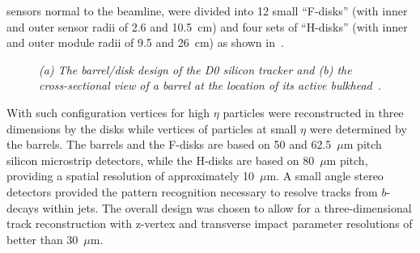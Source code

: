 sensors normal to the beamline, were divided into 12 small ``F-disks'' (with
inner and outer sensor radii of 2.6 and 10.5~cm) and four sets of ``H-disks''
(with inner and outer module radii of 9.5 and 26~cm) as shown in~.
\begin{figure}[!htbp]
  \centering {} 
  \caption{\textit{(a) The barrel/disk design of the D0 silicon tracker and (b)
      the cross-sectional view of a barrel at the location of its active
      bulkhead~\cite{Bean}.}}\label{d_zero}
\end{figure}
With such configuration vertices for high $\eta$ particles were reconstructed in
three dimensions by the disks while vertices of particles at small $\eta$ were
determined by the barrels. The barrels and the F-disks are based on 50 and
62.5~$\mu$m pitch silicon microstrip detectors, while the H-disks are based on
80~$\mu$m pitch, providing a spatial resolution of approximately 10~$\mu$m. A
small angle stereo detectors provided the pattern recognition necessary to
resolve tracks from $b$-decays within jets.  The overall design was chosen to
allow for a three-dimensional track reconstruction with z-vertex and transverse
impact parameter
resolutions of better than 30~$\mu$m.\\

